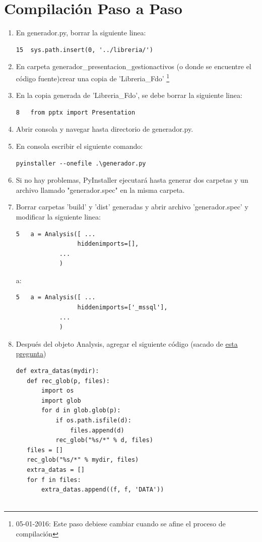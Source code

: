 \documentclass{article}
\begin{document}
\section{Compilación Paso a Paso}
\begin{enumerate}
\item En generador.py, borrar la siguiente linea:
\begin{lstlisting}
15	sys.path.insert(0, '../libreria/')
\end{lstlisting}

\item En carpeta generador\_presentacion\_gestionactivos (o donde se encuentre el código fuente)crear una copia de 'Libreria\_Fdo' \footnote{05-01-2016: Este paso debiese cambiar cuando se afine el proceso de compilación}
\item En la copia generada de 'Libreria\_Fdo', se debe borrar la siguiente linea: 
\begin{lstlisting}
8	from pptx import Presentation
\end{lstlisting}
\item Abrir consola y navegar hasta directorio de generador.py.
\item En consola escribir el siguiente comando:
\begin{lstlisting}
pyinstaller --onefile .\generador.py
\end{lstlisting}
\item Si no hay problemas, PyInstaller ejecutará hasta generar dos carpetas y un archivo llamado "generador.spec" en la misma carpeta. 
\item Borrar carpetas 'build' y 'dist' generadas y abrir archivo 'generador.spec' y modificar la siguiente linea:
\begin{lstlisting}
5	a = Analysis([ ...
        	     hiddenimports=[],
 			...
 			)
\end{lstlisting}
a: 
\begin{lstlisting}
5	a = Analysis([ ...
    	         hiddenimports=['_mssql'],
 			...
 			)
\end{lstlisting}
\item Después del objeto Analysis, agregar el siguiente código (sacado de \href{http://stackoverflow.com/questions/11322538/including-a-directory-using-pyinstaller}{esta pregunta})
\begin{lstlisting}
def extra_datas(mydir):
   def rec_glob(p, files):
       import os
       import glob
       for d in glob.glob(p):
           if os.path.isfile(d):
               files.append(d)
           rec_glob("%s/*" % d, files)
   files = []
   rec_glob("%s/*" % mydir, files)
   extra_datas = []
   for f in files:
       extra_datas.append((f, f, 'DATA'))


\end{lstlisting}
\end{enumerate}
\end{document}
